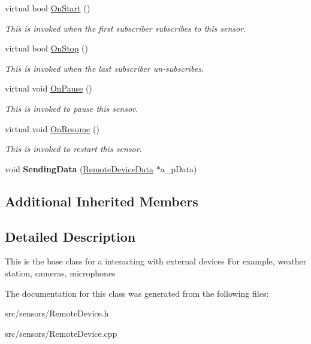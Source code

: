 \begin{DoxyCompactItemize}
virtual bool \hyperlink{class_remote_device_a93c2e32258e85fc97e8791e746c7c51c}{On\+Start} ()
\begin{DoxyCompactList}\small\item\em This is invoked when the first subscriber subscribes to this sensor. \end{DoxyCompactList}\item 
\mbox{\label{class_remote_device_a08118b1873997d1c13bf45cb5b6ba915}} 
virtual bool \hyperlink{class_remote_device_a08118b1873997d1c13bf45cb5b6ba915}{On\+Stop} ()
\begin{DoxyCompactList}\small\item\em This is invoked when the last subscriber un-\/subscribes. \end{DoxyCompactList}\item 
\mbox{\label{class_remote_device_a08a1a57cbb390beca8b50034281f9f9a}} 
virtual void \hyperlink{class_remote_device_a08a1a57cbb390beca8b50034281f9f9a}{On\+Pause} ()
\begin{DoxyCompactList}\small\item\em This is invoked to pause this sensor. \end{DoxyCompactList}\item 
\mbox{\label{class_remote_device_a2d5acc820ae73ac430cf1ee6c365064a}} 
virtual void \hyperlink{class_remote_device_a2d5acc820ae73ac430cf1ee6c365064a}{On\+Resume} ()
\begin{DoxyCompactList}\small\item\em This is invoked to restart this sensor. \end{DoxyCompactList}\item 
\mbox{\label{class_remote_device_aff8d133c0771bb13feebc7c1174e53d3}} 
void {\bfseries Sending\+Data} (\hyperlink{class_remote_device_data}{Remote\+Device\+Data} $\ast$a\+\_\+p\+Data)
\end{DoxyCompactItemize}
\subsection*{Additional Inherited Members}


\subsection{Detailed Description}
This is the base class for a interacting with external devices For example, weather station, cameras, microphones 

The documentation for this class was generated from the following files\+:\begin{DoxyCompactItemize}
\item 
src/sensors/Remote\+Device.\+h\item 
src/sensors/Remote\+Device.\+cpp\end{DoxyCompactItemize}
